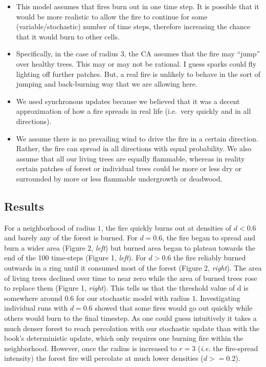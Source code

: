 \documentclass[]{article}
\begin{document}
\begin{itemize}
\item
  This model assumes that fires burn out in one time step. It is
  possible that it would be more realistic to allow the fire to continue
  for some (variable/stochastic) number of time steps, therefore
  increasing the chance that it would burn to other cells.
\item
  Specifically, in the case of radius 3, the CA assumes that the fire
  may ``jump'' over healthy trees. This may or may not be rational. I
  guess sparks could fly lighting off further patches. But, a real fire
  is unlikely to behave in the sort of jumping and back-burning way that
  we are allowing here.
\item
  We used synchronous updates because we believed that it was a decent
  approximation of how a fire spreads in real life (i.e.~very quickly
  and in all directions).
\item
  We assume there is no prevailing wind to drive the fire in a certain
  direction. Rather, the fire can spread in all directions with equal
  probability. We also assume that all our living trees are equally
  flammable, whereas in reality certain patches of forest or individual
  trees could be more or less dry or surrounded by more or less
  flammable undergrowth or deadwood.
\end{itemize}

\hypertarget{results}{%
\subsection{Results}\label{results}}

For a neighborhood of radius \(1\), the fire quickly burns out at
densities of \(d < 0.6\) and barely any of the forest is burned. For
\(d = 0.6\), the fire began to spread and burn a wider area (Figure 2,
\emph{left}) but burned area began to plateau towards the end of the 100
time-steps (Figure 1, \emph{left}). For \(d > 0.6\) the fire reliably
burned outwards in a ring until it consumed most of the forest (Figure
2, \emph{right}). The area of living trees declined over time to near
zero while the area of burned trees rose to replace them (Figure 1,
\emph{right}). This tells us that the threshold value of d is somewhere
around \(0.6\) for our stochastic model with radius \(1\). Investigating
individual runs with \(d = 0.6\) showed that some fires would go out
quickly while others would burn to the final timestep. As one could
guess intuitively it takes a much denser forest to reach percolation
with our stochastic update than with the book's deterministic update,
which only requires one burning fire within the neighborhood. However,
once the radius is increased to \(r = 3\) (\emph{i.e.} the fire-spread
intensity) the forest fire will percolate at much lower densities
(\(d >= 0.2\)).
\end{document}
